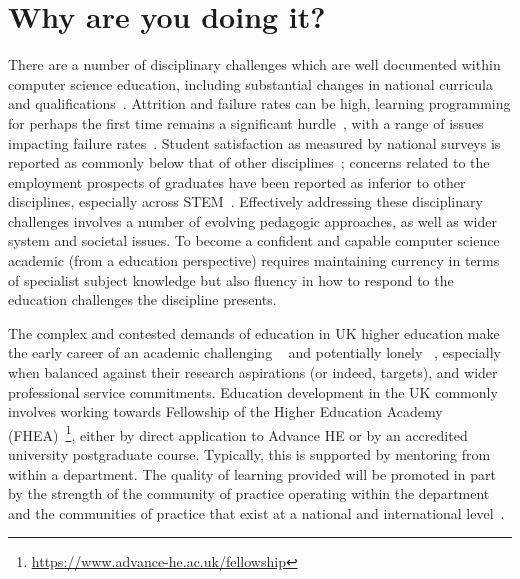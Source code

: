 \documentclass[sigconf]{acmart}
\begin{document}

\section{Why are you doing it?}
There are a number of disciplinary challenges which are well documented within computer science education, including substantial changes in national curricula and qualifications~\cite{brown-et-al-toce2014}. Attrition and failure rates can be high, learning programming for perhaps the first time remains a significant hurdle~\cite{davenport-et-al:latice2016,murphy-et-al:programming2017,simon-et-al:sigcse2018}, with a range of issues impacting failure rates~\cite{Watson:2014:FRI:2591708.2591749,prickett-et-al:iticse2020}. Student satisfaction as measured by national surveys is reported as commonly below that of other disciplines~\cite{Sinclair2015}; concerns related to the employment prospects of graduates have been reported as inferior to other disciplines, especially across STEM~\cite{shadbolt2016shadbolt}. Effectively addressing these disciplinary challenges involves a number of evolving pedagogic approaches, as well as wider system and societal issues. To become a confident and capable computer science academic (from a education perspective) requires maintaining currency in terms of specialist subject knowledge but also fluency in how to respond to the education challenges the discipline presents. %

The complex and contested demands of education in UK higher education make the early career of an academic challenging ~\cite{Thomas2015} and potentially lonely ~\cite{Foote2009}, especially when balanced against their research aspirations (or indeed, targets), and wider professional service commitments. Education development in the UK commonly involves working towards Fellowship of the Higher Education Academy (FHEA)~\footnote{\url{https://www.advance-he.ac.uk/fellowship}}, either by direct application to Advance HE or by an accredited university postgraduate course. Typically, this is supported by mentoring from within a department. The quality of learning provided will be promoted in part by the strength of the community of practice operating within the department~\cite{Bolander2008} and the communities of practice that exist at a national and international level~\cite{Thomas2015}.
\end{document}
